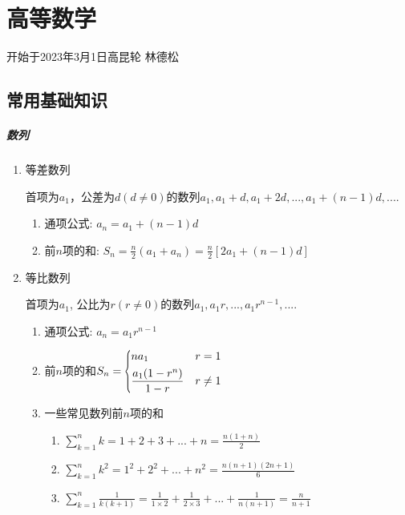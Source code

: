 

\part{高等数学}

开始于2023年3月1日高昆轮
林德松

\pagestyle{mystyle}
\chapter*{常用基础知识}

\subsubsection{数列}
\begin{enumerate}
\item 等差数列\par
首项为$ a_{1} $，公差为$ d(d\neq 0) $的数列$ a_{1},a_{1}+d,a_{1}+2d,...,a_{1}+(n-1)d,... $.
\begin{enumerate}
\item 通项公式: $ a_{n}=a_{1}+(n-1)d $
\item 前$ n $项的和: $ S_{n}=\frac{n}{2}(a_{1}+a_{n})=\frac{n}{2}[2a_{1}+(n-1)d] $
\end{enumerate}
\item 等比数列\par
首项为$ a_{1} $, 公比为$ r(r\neq 0) $的数列$ a_{1},a_{1}r,...,a_{1}r^{n-1},... $.
\begin{enumerate}
\item 通项公式: $ a_{n}=a_{1}r^{n-1} $
\item 前$ n $项的和$ S_{n}=\scaleleftright[6pt]{\biggl\{}{\begin{aligned}
& na_{1}\ & r=1 \\
& \frac{a_{1}(1-r^{n})}{1-r} & r\neq 1
\end{aligned}}{.} $
\item 一些常见数列前$ n $项的和\par
\begin{enumerate}
\item $ \sum_{k=1}^{n}k=1+2+3+...+n=\frac{n(1+n)}{2} $
\item $ \sum_{k=1}^{n}k^{2}=1^{2}+2^{2}+...+n^{2}=\frac{n(n+1)(2n+1)}{6} $
\item $ \sum_{k=1}^{n}\frac{1}{k(k+1)}=\frac{1}{1\times 2}+\frac{1}{2\times 3}+...+\frac{1}{n(n+1)}=\frac{n}{n+1} $
\end{enumerate}
\end{enumerate}
\end{enumerate}
